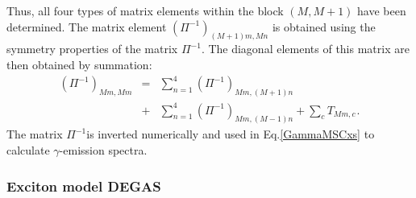 Thus, all four types of matrix elements within the block $(M,M+1)$ have been
determined. The matrix element $(\Pi^{-1})_{(M+1)m,Mn}$ is obtained using
the symmetry properties of the matrix $\Pi^{-1}$. The diagonal elements of
this matrix are then obtained by summation:
\begin{eqnarray}
(\Pi^{-1})_{Mm,Mm} &=& \sum_{n=1}^{4}(\Pi^{-1})_{Mm,(M+1)n} \\
&+& \sum_{n=1}^{4}(\Pi^{-1})_{Mm,(M-1)n} + \sum_{c}T_{Mm,c} \hspace{1pt}.
\nonumber
\end{eqnarray}
The matrix $\Pi^{-1}$is inverted numerically and used in Eq.\ref{GammaMSCxs}
to calculate $\gamma$-emission spectra.


\subsubsection{Exciton model DEGAS\label{DEGAS}}

